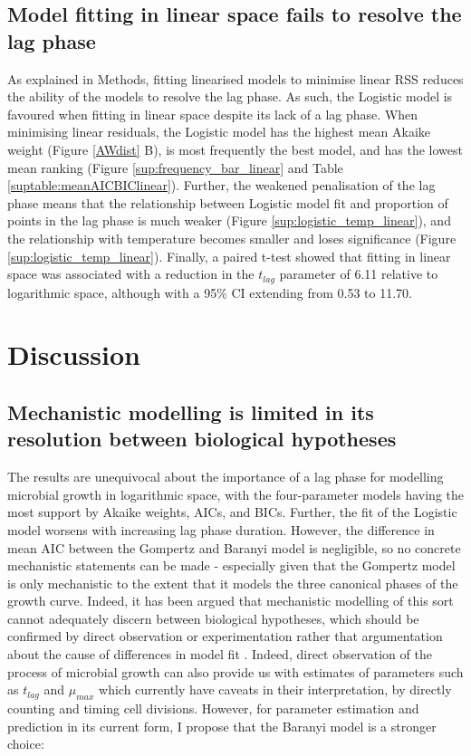 \documentclass[11pt, a4paper]{article}
\begin{document}
\begin{linenumbers}
\subsection{Model fitting in linear space fails to resolve the lag phase}
As explained in Methods, fitting linearised models to minimise linear RSS reduces the ability of the models to resolve the lag phase. As such, the Logistic model is favoured when fitting in linear space despite its lack of a lag phase. When minimising linear residuals, the Logistic model has the highest mean Akaike weight (Figure \ref{AWdist} B), is most frequently the best model, and has the lowest mean ranking (Figure \ref{sup:frequency_bar_linear} and Table \ref{suptable:meanAICBIClinear}). Further, the weakened penalisation of the lag phase means that the relationship between Logistic model fit and proportion of points in the lag phase is much weaker (Figure \ref{sup:logistic_temp_linear}), and the relationship with temperature becomes smaller and loses significance (Figure \ref{sup:logistic_temp_linear}). Finally, a paired t-test showed that fitting in linear space was associated with a reduction in the $t_{lag}$ parameter of 6.11 relative to logarithmic space, although with a 95\% CI extending from 0.53 to 11.70.



\section{Discussion}
\subsection{Mechanistic modelling is limited in its resolution between biological hypotheses}
The results are unequivocal about the importance of a lag phase for modelling microbial growth in logarithmic space, with the four-parameter models having the most support by Akaike weights, AICs, and BICs. Further, the fit of the Logistic model worsens with increasing lag phase duration. However, the difference in mean AIC between the Gompertz and Baranyi model is negligible, so no concrete mechanistic statements can be made - especially given that the Gompertz model is only mechanistic to the extent that it models the three canonical phases of the growth curve. Indeed, it has been argued that mechanistic modelling of this sort cannot adequately discern between biological hypotheses, which should be confirmed by direct observation or experimentation rather that argumentation about the cause of differences in model fit \cite{MicrobialGrowth}. Indeed, direct observation of the process of microbial growth can also provide us with estimates of parameters such as $t_{lag}$ and $\mu_{max}$ which currently have caveats in their interpretation, by directly counting and timing cell divisions. However, for parameter estimation and prediction in its current form, I propose that the Baranyi model is a stronger choice:


\end{linenumbers}
\end{document}
